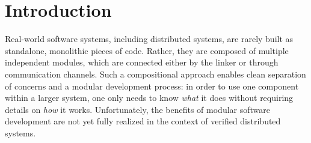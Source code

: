 \newcommand{\nstep}[2]{\mathrel{\oset{#2}{~\leadsto_{#1}~}}}
\newcommand{\nsem}[4]{{#3}\mathrel{\overset{#2}{\leadsto_{#1}}}{#4}}
\newcommand{\ninf}[4]{{#3}\mathrel{\oset{\!\!\!\neg{#2}*}{\leadsto_{#1}}}{#4}}
\newcommand{\nsemw}[4]{{#3}\mathrel{\oset{w, #2}{\leadsto_{#1}}}{#4}}


\newcommand{\tprep}{\mathsf{Prepare}}
\newcommand{\tyes}{\mathsf{Yes}}
\newcommand{\tno}{\mathsf{No}}
\newcommand{\tcommit}{\mathsf{Commit}}
\newcommand{\tabort}{\mathsf{Abort}}
\newcommand{\tackcommit}{\mathsf{AckCommit}}
\newcommand{\tackabort}{\mathsf{AckAbort}}

\newcommand{\cn}{\mathsf{Coord}}
\newcommand{\pts}{\overline{P}}
\newcommand{\pt}{\mathtt{pt}}


\newcommand{\round}{\mathit{r}}
\newcommand{\tpclog}{\mathit{log}}
\newcommand{\data}{\mathit{data}}

\newcommand{\stat}{\kappa}
\newcommand{\done}{\mathsf{done}}
\newcommand{\tagi}{\mathit{tag}}
\newcommand{\prei}{\mathit{pre}}
\newcommand{\stepi}{\mathit{step}}

\newcommand{\pinit}{\mathsf{PInit}}
\newcommand{\pgotreq}{\mathsf{PGotRequest}}
\newcommand{\pyes}{\mathsf{PRespYes}}
\newcommand{\pno}{\mathsf{PRespNo}}
\newcommand{\pcommit}{\mathsf{PCommit}}
\newcommand{\pabort}{\mathsf{PAbort}}

\newcommand{\cinit}{\mathsf{CInit}}
\newcommand{\csendprep}{\mathsf{CSendPrep}}
\newcommand{\cwaitprep}{\mathsf{CWaitPrepResp}}
\newcommand{\csendcommit}{\mathsf{CSendCommit}}
\newcommand{\csendabort}{\mathsf{CSendAbort}}
\newcommand{\cwaitcommit}{\mathsf{CWaitCommitAck}}
\newcommand{\cwaitabort}{\mathsf{CWaitAbortAck}}

\newcommand{\spa}{\phantom{zz}}
\newcommand{\spb}{\phantom{zzzz}}
\newcommand{\code}[1]{\lstinline[basicstyle=\small\ttfamily]{#1}}
\newcommand{\fld}{\#}

\newcommand{\SendEffect}{\mathsf{Sent}}
\newcommand{\ReceiveEffect}{\mathsf{Received}}


\section{Introduction}
\label{sec:intro}

Real-world software systems, including distributed systems, are rarely
built as standalone, monolithic pieces of code.
%
Rather, they are composed of multiple independent modules, which are
connected either by the linker or through communication channels.
%
Such a compositional approach enables clean separation of concerns and
a modular development process: in order to use one component within a
larger system, one only needs to know \emph{what} it does without
requiring details on \emph{how} it works.
%
Unfortunately, the benefits of modular software development are not
yet fully realized in the context of verified distributed systems.

